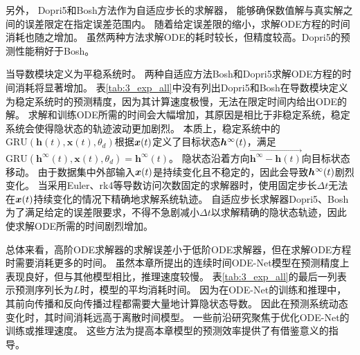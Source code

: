 另外，
Dopri5和Bosh方法作为自适应步长的求解器，
能够确保数值解与真实解之间的误差限定在指定误差范围内。
随着给定误差限的缩小，求解ODE方程的时间消耗也随之增加。
虽然两种方法求解ODE的耗时较长，但精度较高。Dopri5的预测性能稍好于Bosh。


当导数模块定义为平稳系统时。
两种自适应方法Bosh和Dopri5求解ODE方程的时间消耗将显著增加。
表\ref{tab:3_exp_all}中没有列出Dopri5和Bosh在导数模块定义为稳定系统时的预测精度，因为其计算速度极慢，无法在限定时间内给出ODE的解。
求解和训练ODE所需的时间会大幅增加，其原因是相比于非稳定系统，稳定系统会使得隐状态的轨迹波动更加剧烈。
本质上，稳定系统中的$\text{GRU}\left(\boldsymbol{h}(t), \boldsymbol{x}(t), \theta_{d}\right)$根据$\boldsymbol x(t)$定义了目标状态$\boldsymbol h^{\infty}(t)$，满足$\text{GRU}\left(\boldsymbol{h}^{\infty}(t), \boldsymbol{x}(t), \theta_{d}\right)=\boldsymbol{h}^{\infty}(t)$。
隐状态沿着方向$\overrightarrow{\boldsymbol{h}^\infty-\boldsymbol h(t)}$向目标状态移动。
由于数据集中外部输入$\boldsymbol x(t)$是持续变化且不稳定的，因此会导致$\boldsymbol h^{\infty}(t)$剧烈变化。
当采用Euler、rk4等导数访问次数固定的求解器时，使用固定步长$\Delta t$无法在$\boldsymbol x(t)$持续变化的情况下精确地求解系统轨迹。
自适应步长求解器Dopri5、Bosh为了满足给定的误差限要求，不得不急剧减小$\Delta t$以求解精确的隐状态轨迹，因此使求解ODE所需的时间剧烈增加。

总体来看，高阶ODE求解器的求解误差小于低阶ODE求解器，但在求解ODE方程时需要消耗更多的时间。
虽然本章所提出的连续时间ODE-Net模型在预测精度上表现良好，但与其他模型相比，推理速度较慢。
表\ref{tab:3_exp_all}的最后一列表示预测序列长为$L$时，模型的平均消耗时间。
因为在ODE-Net的训练和推理中，其前向传播和反向传播过程都需要大量地计算隐状态导数。
因此在预测系统动态变化时，其时间消耗远高于离散时间模型。
一些前沿研究\cite{J2020,poli2020,kelly2020}聚焦于优化ODE-Net的训练或推理速度。
这些方法为提高本章模型的预测效率提供了有借鉴意义的指导。

